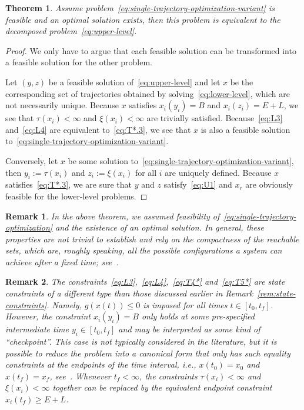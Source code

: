 \documentclass[a4paper]{report}
\theoremstyle{definition}
\theoremstyle{plain}
\newtheorem{theorem}{Theorem}[chapter]
\newtheorem{remark}{Remark}[chapter]
\begin{document}
\begin{theorem}
  Assume problem~\eqref{eq:single-trajectory-optimization-variant} is feasible and an optimal solution exists, then this
  problem is equivalent to the decomposed problem~\eqref{eq:upper-level}.
\end{theorem}
\begin{proof}
  We only have to argue that each feasible solution can be transformed into a
  feasible solution for the other problem.

  Let $(y,z)$ be a feasible solution of~\eqref{eq:upper-level} and let $x$ be
  the corresponding set of trajectories obtained by
  solving~\eqref{eq:lower-level}, which are not necessarily unique. Because $x$
  satisfies $x_{i}(y_{i}) = B$ and $x_{i}(z_{i}) = E + L$, we see that
  $\tau(x_{i}) < \infty$ and $\xi(x_{i}) < \infty$ are trivially satisfied.
  Because~\eqref{eq:L3} and~\eqref{eq:L4} are equivalent to~\eqref{eq:T*.3}, we
  see that $x$ is also a feasible solution
  to~\eqref{eq:single-trajectory-optimization-variant}.

  Conversely, let $x$ be some solution
  to~\eqref{eq:single-trajectory-optimization-variant}, then
  $y_{i} := \tau(x_{i})$ and $z_{i} := \xi(x_{i})$ for all $i$ are uniquely
  defined. Because $x$ satisfies~\eqref{eq:T*.3}, we are sure that $y$ and $z$
  satisfy~\eqref{eq:U1} and $x_{r}$ are obviously feasible for the lower-level
  problems.
\end{proof}

\begin{remark}
  In the above theorem, we assumed feasibility of~\eqref{eq:single-trajectory-optimization} and the existence of an optimal solution.
  In general, these properties are not trivial to establish and rely on the
  compactness of the reachable sets, which are, roughly speaking, all the
  possible configurations a system can achieve after a fixed time;
  see~\cite[Section 4.5]{liberzonCalculusVariationsOptimal}.
\end{remark}


\begin{remark}
  The constraints~\eqref{eq:L3},~\eqref{eq:L4},~\eqref{eq:T4*}
  and~\eqref{eq:T5*} are state constraints of a different type than those
  discussed earlier in Remark~\ref{rem:state-constraints}. Namely,
  $g(x(t)) \leq 0$ is imposed for all times $t \in [t_{0}, t_{f}]$.
  However, the constraint $x_{i}(y_{i}) = B$ only holds at some pre-specified
  intermediate time $y_{i} \in [t_{0}, t_{f}]$ and may be interpreted as some
  kind of ``checkpoint''.
  This case is not typically considered in the literature, but it is
  possible to reduce the problem into a canonical form that only has such
  equality constraints at the endpoints of the time interval, i.e.,
  $x(t_{0}) = x_{0}$ and $x(t_{f}) = x_{f}$,
  see~\cite{dmitrukMaximumPrincipleOptimal2011}.
  Whenever $t_{f} < \infty$, the constraints $\tau(x_{i}) < \infty$ and
  $\xi(x_{i}) < \infty$ together can be replaced by the equivalent endpoint
  constraint $x_{i}(t_{f}) \geq E + L$.
\end{remark}
\end{document}
